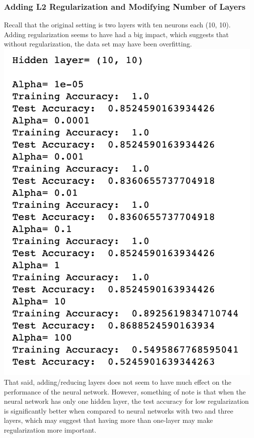 \documentclass[11pt, oneside]{article}
\begin{document}
\subsubsection *{Adding L2 Regularization and Modifying Number of Layers}
Recall that the original setting is two layers with ten neurons each (10, 10). Adding regularization seems to have had a big impact, which suggests that without regularization, the data set may have been overfitting. \\
\includegraphics{7}\\
That said, adding/reducing layers does not seem to have much effect on the performance of the neural network. However, something of note is that when the neural network has only one hidden layer, the test accuracy for low regularization is significantly better when compared to neural networks with two and three layers, which may suggest that having more than one-layer may make regularization more important.\\
\end{document}
